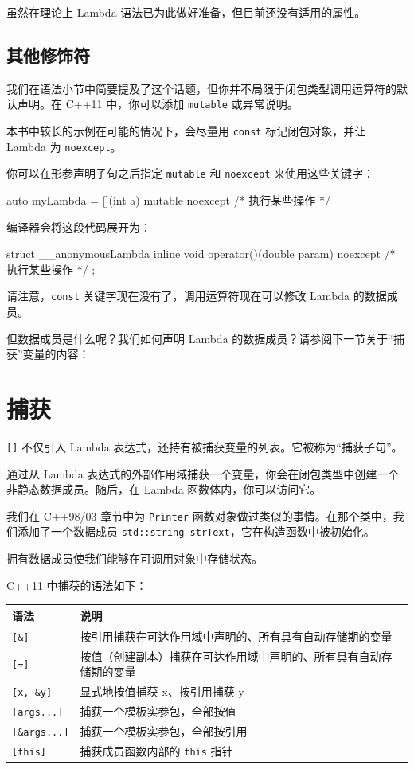 虽然在理论上 Lambda 语法已为此做好准备，但目前还没有适用的属性。

\subsection{其他修饰符}

我们在语法小节中简要提及了这个话题，但你并不局限于闭包类型调用运算符的默认声明。在 C++11 中，你可以添加 \texttt{mutable} 或异常说明。


本书中较长的示例在可能的情况下，会尽量用 \texttt{const} 标记闭包对象，并让 Lambda 为 \texttt{noexcept}。

你可以在形参声明子句之后指定 \texttt{mutable} 和 \texttt{noexcept} 来使用这些关键字：

\begin{codebox}
auto myLambda = [](int a) mutable noexcept { /* 执行某些操作 */ }
\end{codebox}

编译器会将这段代码展开为：

\begin{codebox}
struct __anonymousLambda {
inline void operator()(double param) noexcept { /* 执行某些操作 */ }
};
\end{codebox}

请注意，\texttt{const} 关键字现在没有了，调用运算符现在可以修改 Lambda 的数据成员。

但数据成员是什么呢？我们如何声明 Lambda 的数据成员？请参阅下一节关于“捕获”变量的内容：

\section{捕获}

\texttt{[]} 不仅引入 Lambda 表达式，还持有被捕获变量的列表。它被称为“捕获子句”。

通过从 Lambda 表达式的外部作用域捕获一个变量，你会在闭包类型中创建一个非静态数据成员。随后，在 Lambda 函数体内，你可以访问它。

我们在 C++98/03 章节中为 \texttt{Printer} 函数对象做过类似的事情。在那个类中，我们添加了一个数据成员 \texttt{std::string strText}，它在构造函数中被初始化。

拥有数据成员使我们能够在可调用对象中存储状态。

C++11 中捕获的语法如下：

\begin{tabular}{ll}
\hline
语法 & 说明 \\
\hline
\texttt{[\&]} & 按引用捕获在可达作用域中声明的、所有具有自动存储期的变量 \\
\texttt{[=]} & 按值（创建副本）捕获在可达作用域中声明的、所有具有自动存储期的变量 \\
\texttt{[x, \&y]} & 显式地按值捕获 x、按引用捕获 y \\
\texttt{[args...]} & 捕获一个模板实参包，全部按值 \\
\texttt{[\&args...]} & 捕获一个模板实参包，全部按引用 \\
\texttt{[this]} & 捕获成员函数内部的 \texttt{this} 指针 \\
\hline
\end{tabular}

